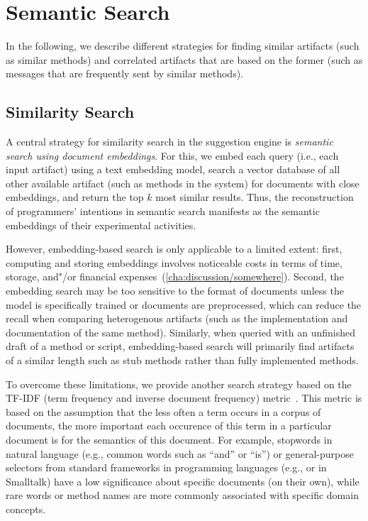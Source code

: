 
\section{Semantic Search}
\label{sec:suggestions/search}

In the following, we describe different strategies for finding similar artifacts (such as similar methods) and correlated artifacts that are based on the former (such as messages that are frequently sent by similar methods).

\subsection{Similarity Search}
\label{sec:suggestions/search/similar}

A central strategy for similarity search in the suggestion engine is \emph{semantic search using document embeddings}.
For this, we embed each query (i.e., each input artifact) using a text embedding model, search a vector database of all other available artifact (such as methods in the system) for documents with close embeddings, and return the top $k$ most similar results.
Thus, the reconstruction of programmers' intentions in semantic search manifests as the semantic embeddings of their experimental activities.

However, embedding-based search is only applicable to a limited extent:
first, computing and storing embeddings involves noticeable costs in terms of time, storage, and"/or financial expenses~(\cref{cha:discussion/somewhere}).
Second, the embedding search may be too sensitive to the format of documents unless the model is specifically trained or documents are preprocessed, which can reduce the recall when comparing heterogenous artifacts (such as the implementation and documentation of the same method).
Similarly, when queried with an unfinished draft of a method or script, embedding-based search will primarily find artifacts of a similar length such as stub methods rather than fully implemented methods.

To overcome these limitations, we provide another search strategy based on the TF-IDF (term frequency and inverse document frequency) metric~\cite{salton1988term}.
This metric is based on the assumption that the less often a term occurs in a corpus of documents, the more important each occurence of this term in a particular document is for the semantics of this document.
For example, stopwords in natural language (e.g., common words such as ``and'' or ``is'') or general-purpose selectors from standard frameworks in programming languages (e.g.,  or  in Smalltalk) have a low significance about specific documents (on their own), while rare words or method names are more commonly associated with specific domain concepts.

